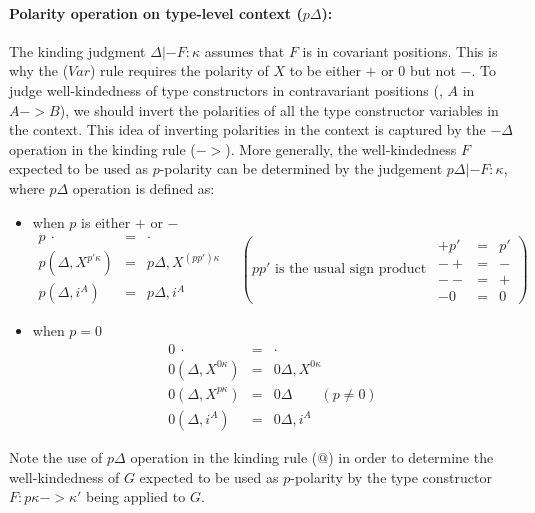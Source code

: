 \paragraph{Polarity operation on type-level context ($p\Delta$):}
The kinding judgment $\Delta |- F : \kappa$ assumes that $F$ is in covariant
positions. This is why the ($Var$) rule requires the polarity of $X$ to be
either $+$ or $0$ but not $-$. To judge well-kindedness of type constructors
in contravariant positions (\eg, $A$ in $A -> B$), we should invert
the polarities of all the type constructor variables in the context.
This idea of inverting polarities in the context is captured by the $-\Delta$
operation in the kinding rule ($->$). More generally, the well-kindedness $F$
expected to be used as $p$-polarity can be determined by the judgement
$p\Delta |- F : \kappa$, where $p\Delta$ operation is defined as:
\begin{itemize}
	\item when $p$ is either $+$ or $-$\vspace*{-2ex}
		\[
		\begin{array}{lcl}
		p~\cdot &=& \cdot \\
		p(\Delta,X^{p'\kappa}) &=& p\Delta,X^{(pp')\kappa} \\
		p(\Delta,i^A) &=& p\Delta,i^A
		\end{array}
		\quad\left(\text{$pp'$ is the usual sign product}~~
		\begin{smallmatrix}
		+ p' & = & p' \\
		- +  & = & -  \\
		- -  & = & +  \\
		- 0  & = & 0
		\end{smallmatrix}\right)
	\]
	\item when $p=0$\vspace*{-2ex}
		\[
		\begin{array}{lcl}
		0~\cdot &=& \cdot \\
		0(\Delta,X^{0\kappa}) &=& 0\Delta,X^{0\kappa} \\
		0(\Delta,X^{p\kappa}) &=& 0\Delta \qquad(p\neq 0)\\
		0(\Delta,i^A) &=& 0\Delta,i^A
		\end{array}
		\]
\end{itemize}
Note the use of $p\Delta$ operation in the kinding rule ($@$) in order to
determine the well-kindedness of $G$ expected to be used as $p$-polarity
by the type constructor $F : p\kappa -> \kappa'$ being applied to $G$.


